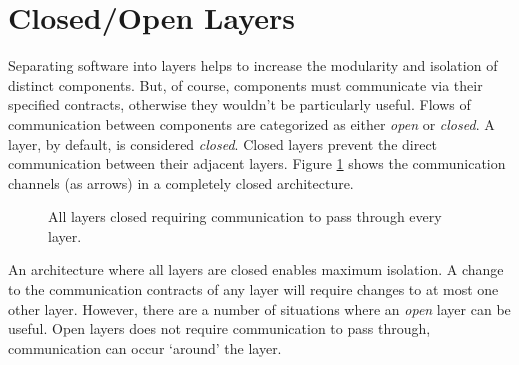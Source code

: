 \section{Closed/Open Layers}

Separating software into layers helps to increase the modularity and isolation of distinct components.
But, of course, components must communicate via their specified contracts, otherwise they wouldn't be particularly useful.
Flows of communication between components are categorized as either \textsl{open} or \textsl{closed}.
A layer, by default, is considered \textsl{closed}.
Closed layers prevent the direct communication between their adjacent layers.
Figure \ref{fig:closed-layers} shows the communication channels (as arrows) in a completely closed architecture.

\begin{figure}[ht]
    \centering
    \caption{All layers closed requiring communication to pass through every layer.}
    \label{fig:closed-layers}
\end{figure}

An architecture where all layers are closed enables maximum isolation.
A change to the communication contracts of any layer will require changes to at most one other layer.
However, there are a number of situations where an \textsl{open} layer can be useful.
Open layers does not require communication to pass through, communication can occur `around' the layer.


